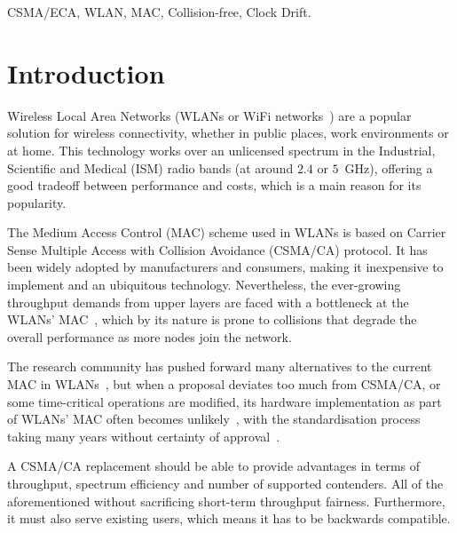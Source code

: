 \documentclass[a4paper,journal]{IEEEtran}
\begin{document}
\begin{IEEEkeywords}
CSMA/ECA, WLAN, MAC, Collision-free, Clock Drift.
\end{IEEEkeywords}

\section{Introduction}\label{introduction}
Wireless Local Area Networks (WLANs or WiFi networks~\cite{802Standards}) are a popular solution for wireless connectivity, whether in public places, work environments or at home. This technology works over an unlicensed spectrum in the Industrial, Scientific and Medical (ISM) radio bands (at around $2.4$ or $5$~GHz), offering a good tradeoff between performance and costs, which is a main reason for its popularity. 

The Medium Access Control (MAC) scheme used in WLANs is based on Carrier Sense Multiple Access with Collision Avoidance (CSMA/CA) protocol. It has been widely adopted by manufacturers and consumers, making it inexpensive to implement and an ubiquitous technology. Nevertheless, the ever-growing throughput demands from upper layers are faced with a bottleneck at the WLANs' MAC~\cite{perahia2008ieee}, which by its nature is prone to collisions that degrade the overall performance as more nodes join the network.

The research community has pushed forward many alternatives to the current MAC in WLANs~\cite{bharghavan1994map,wang2004ncr,cali2000dti,lopez-toledo2006aoi,
barcelo2008lba,bellalta2009vtc,HE,CSMA_ECA,L_MAC2,hui2011epp,barcelo2011tcf}, but when a proposal deviates too much from CSMA/CA, or some time-critical operations are modified, its hardware implementation as part of WLANs' MAC often becomes unlikely~\cite{WMP}, with the standardisation process taking many years without certainty of approval~\cite{perahia2008ieee}. 

A CSMA/CA replacement should be able to provide advantages in terms of throughput, spectrum efficiency and number of supported contenders. All of the aforementioned without sacrificing short-term throughput fairness. Furthermore, it must also serve existing users, which means it has to be backwards compatible.
\end{document}
